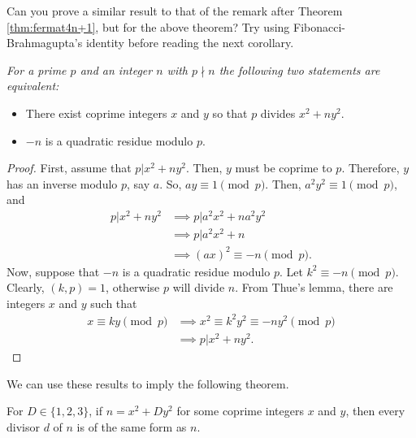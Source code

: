 \documentclass{subfile}
\begin{document}
	\begin{question}
		Can you prove a similar result to that of the remark after Theorem \ref{thm:fermat4n+1}, but for the above theorem? Try using Fibonacci-Brahmagupta's identity before reading the next corollary.
	\end{question}
	
	\begin{corollary}\slshape\label{cor:p|x^2+ny^2}
		For a prime $p$ and an integer $n$ with $p \nmid n$ the following two statements are equivalent:
		\begin{itemize}
			\item There exist coprime integers $x$ and $y$ so that $p$ divides $x^2+ny^2$.
			\item $-n$ is a quadratic residue modulo $p$.
		\end{itemize}
	\end{corollary}
	
	\begin{proof}
		First, assume that $p|x^2+ny^2$. Then, $y$ must be coprime to $p$. Therefore, $y$ has an inverse modulo $p$, say $a$. So, $ay\equiv1\pmod p$. Then, $a^2y^2  \equiv1\pmod p$, and
		\begin{align*}
			p | x^2 + ny^2 &\implies p |a^2x^2+na^2y^2\\
			& \implies p |a^2x^2+n\\
			& \implies (ax)^2 \equiv-n\pmod p.
		\end{align*}
		Now, suppose that $-n$ is a quadratic residue modulo $p$. Let $k^2\equiv-n\pmod p$. Clearly, $(k,p)=1$, otherwise $p$ will divide $n$. From Thue's lemma, there are integers $x$ and $y$ such that 
		\begin{align*}
			x \equiv ky\pmod p & \implies x^2 \equiv k^2y^2 \equiv-ny^2\pmod p\\
			&\implies  p |x^2+ny^2.
		\end{align*}
	\end{proof}
	We can use these results to imply the following theorem.
	\begin{theorem}
		For $D\in\{1,2,3\}$, if $n=x^2+Dy^2$ for some coprime integers $x$ and $y$, then every divisor $d$ of $n$ is of the same form as $n$.
	\end{theorem}
	
\end{document}
